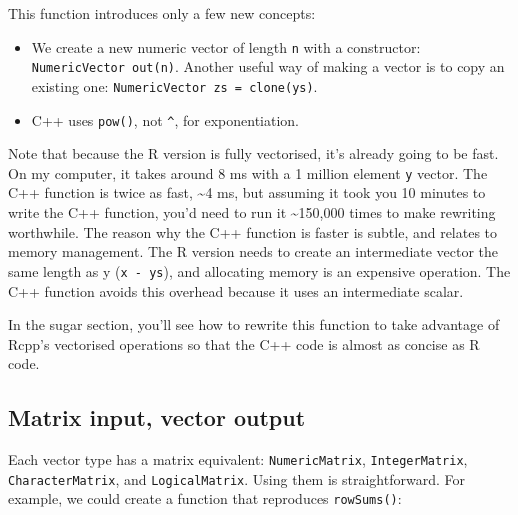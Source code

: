 This function introduces only a few new concepts:

\begin{itemize}
\item
  We create a new numeric vector of length \texttt{n} with a
  constructor: \texttt{NumericVector out(n)}. Another useful way of
  making a vector is to copy an existing one:
  \texttt{NumericVector zs = clone(ys)}.
\item
  C++ uses \texttt{pow()}, not \texttt{\^{}}, for exponentiation.
\end{itemize}

Note that because the R version is fully vectorised, it's already going
to be fast. On my computer, it takes around 8 ms with a 1 million
element \texttt{y} vector. The C++ function is twice as fast,
\textasciitilde{}4 ms, but assuming it took you 10 minutes to write the
C++ function, you'd need to run it \textasciitilde{}150,000 times to
make rewriting worthwhile. The reason why the C++ function is faster is
subtle, and relates to memory management. The R version needs to create
an intermediate vector the same length as y (\texttt{x - ys}), and
allocating memory is an expensive operation. The C++ function avoids
this overhead because it uses an intermediate scalar.

In the sugar section, you'll see how to rewrite this function to take
advantage of Rcpp's vectorised operations so that the C++ code is almost
as concise as R code.

\subsection{Matrix input, vector output}

Each vector type has a matrix equivalent: \texttt{NumericMatrix},
\texttt{IntegerMatrix}, \texttt{CharacterMatrix}, and
\texttt{LogicalMatrix}. Using them is straightforward. For example, we
could create a function that reproduces \texttt{rowSums()}:

\begin{Shaded}
\begin{Highlighting}[]
\NormalTok{(}

\StringTok{    \}}
\StringTok{  \}}
\NormalTok{)}
\NormalTok{(}\NormalTok{)}
\StringTok{ }\NormalTok{(}\NormalTok{(}\NormalTok{), }\NormalTok{)}
\end{Highlighting}
\end{Shaded}


